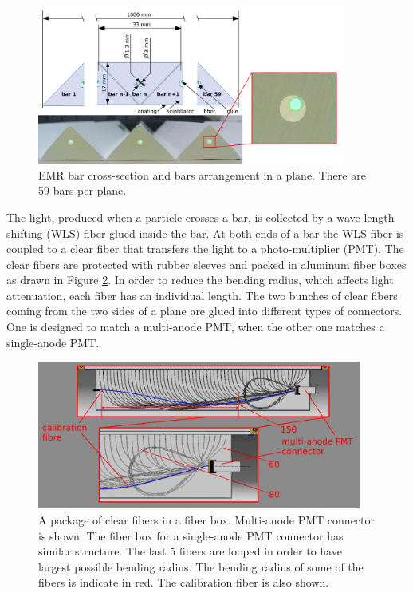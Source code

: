 \documentclass[a4paper,11pt]{article}
\begin{document}
\begin{figure}[htp!]
 \centering
 \includegraphics[width=0.9\textwidth]{./bar_arrangement_in_a_plane}
 \caption[EMR bar cross-section and plane arrangement]{EMR bar cross-section and bars arrangement in a plane. There are 59 bars per plane.}
 \label{fig:bar_arrangement_in_a_plane}
\end{figure}


The light, produced when a particle crosses a bar, is collected by a wave-length shifting (WLS) fiber glued inside the bar. 
At both ends of a bar the WLS fiber is coupled to a clear fiber that transfers the light to a photo-multiplier
(PMT). The clear fibers are protected with rubber sleeves and packed in aluminum fiber boxes as drawn in Figure 
\ref{fig:clear_fiber_package}. In order to reduce the bending radius, which affects light attenuation, each fiber has an individual
length. The two bunches of clear fibers coming from the two sides of a plane are glued into different types of connectors.
One is designed to match a multi-anode PMT, when the other one matches a single-anode PMT.

\begin{figure}[ht]
 \centering
 \includegraphics[width=0.95\textwidth]{./clear_fiber_package}
 \caption[A package of clear fibers in a fiber box]{ A package of clear fibers in a fiber box. Multi-anode PMT connector is shown.
 The fiber box for a single-anode PMT connector has similar structure. The last 5 fibers are looped in order to have largest possible
 bending radius. The bending radius of some of the fibers is indicate in red. The calibration fiber is also shown. }
 \label{fig:clear_fiber_package}
\end{figure}
\end{document}
